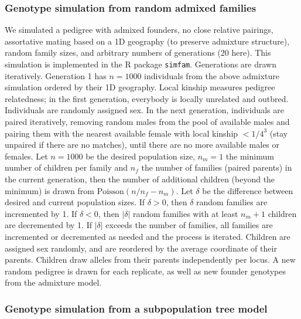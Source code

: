 \documentclass[11pt]{article}
\begin{document}
\begin{linenumbers}
\subsubsection{Genotype simulation from random admixed families}

We simulated a pedigree with admixed founders, no close relative pairings, assortative mating based on a 1D geography (to preserve admixture structure), random family sizes, and arbitrary numbers of generations (20 here).
This simulation is implemented in the R package \texttt{simfam}.
Generations are drawn iteratively.
Generation 1 has $n=1000$ individuals from the above admixture simulation ordered by their 1D geography.
Local kinship measures pedigree relatedness; in the first generation, everybody is locally unrelated and outbred.
Individuals are randomly assigned sex.
In the next generation, individuals are paired iteratively, removing random males from the pool of available males and pairing them with the nearest available female with local kinship $< 1/4^3$ (stay unpaired if there are no matches), until there are no more available males or females.
Let $n=1000$ be the desired population size, $n_m=1$ the minimum number of children per family and $n_f$ the number of families (paired parents) in the current generation, then the number of additional children (beyond the minimum) is drawn from $\text{Poisson}(n/n_f - n_m)$.
Let $\delta$ be the difference between desired and current population sizes.
If $\delta > 0$, then $\delta$ random families are incremented by 1.
If $\delta < 0$, then $|\delta|$ random families with at least $n_m+1$ children are decremented by 1.
If $|\delta|$ exceeds the number of families, all families are incremented or decremented as needed and the process is iterated.
Children are assigned sex randomly, and are reordered by the average coordinate of their parents.
Children draw alleles from their parents independently per locus.
A new random pedigree is drawn for each replicate, as well as new founder genotypes from the admixture model.

\subsubsection{Genotype simulation from a subpopulation tree model}


\end{linenumbers}
\end{document}
